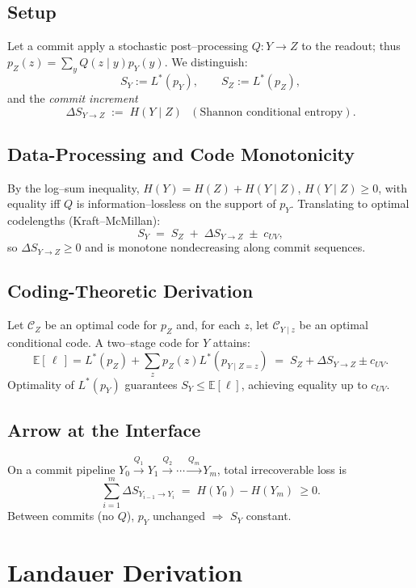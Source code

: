 \documentclass[11pt,letterpaper]{article}
\theoremstyle{definition}
\theoremstyle{remark}
\begin{document}
\subsection{Setup}

Let a commit apply a stochastic post--processing \(Q\!:\!Y\!\to\!Z\) to the readout; thus \(p_Z(z)=\sum_y Q(z\mid y)p_Y(y)\). We distinguish:
\[
S_Y := L^\ast(p_Y),\qquad
S_Z := L^\ast(p_Z),
\]
and the \emph{commit increment}
\[
\Delta S_{Y\to Z} \;:=\; H(Y\mid Z)\ \ \ (\text{Shannon conditional entropy}).
\]

\subsection{Data-Processing and Code Monotonicity}

By the log--sum inequality, \(H(Y)=H(Z)+H(Y\mid Z)\), \(H(Y\mid Z)\ge 0\), with equality iff \(Q\) is information--lossless on the support of \(p_Y\). Translating to optimal codelengths (Kraft--McMillan):
\[
S_Y \;=\; S_Z \;+\; \Delta S_{Y\to Z} \;\pm\; c_{UV},
\]
so \(\Delta S_{Y\to Z}\ge 0\) and is monotone nondecreasing along commit sequences.

\subsection{Coding-Theoretic Derivation}

Let \(\mathcal{C}_Z\) be an optimal code for \(p_Z\) and, for each \(z\), let \(\mathcal{C}_{Y\mid z}\) be an optimal conditional code. A two--stage code for \(Y\) attains:
\[
\mathbb{E}[\,\ell\,]= L^\ast(p_Z) + \sum_z p_Z(z)L^\ast(p_{Y\mid Z=\!z}) \;=\; S_Z + \Delta S_{Y\to Z}\pm c_{UV}.
\]
Optimality of \(L^\ast(p_Y)\) guarantees \(S_Y\le \mathbb{E}[\ell]\), achieving equality up to \(c_{UV}\).

\subsection{Arrow at the Interface}

On a commit pipeline \(Y_0\xrightarrow{Q_1}Y_1\xrightarrow{Q_2}\cdots\xrightarrow{Q_m}Y_m\), total irrecoverable loss is
\[
\sum_{i=1}^m \Delta S_{Y_{i-1}\to Y_i} \;=\; H(Y_0)-H(Y_m)\ \ge 0.
\]
Between commits (no \(Q\)), \(p_Y\) unchanged \(\Rightarrow\) \(S_Y\) constant.

\section{Landauer Derivation}\label{app:landauer}
\end{document}
